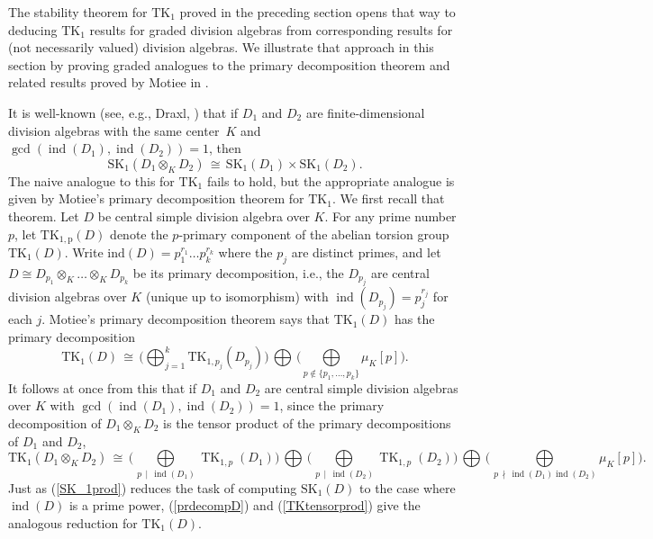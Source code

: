 \documentclass[11pt]{article}
\numberwithin{equation}{section}
\theoremstyle{plain}
\theoremstyle{remark}
\newcommand{\opn}{\operatorname}
\newcommand{\SK}{\opn{SK_1}}
\newcommand{\TK}{\opn{TK_1}}
\newcommand{\ind}{\text{ind}}
\begin{document}
The stability theorem for $\TK$ proved in the preceding section opens that way to deducing $\TK$ results for 
graded division algebras from corresponding results for (not necessarily valued) division algebras.  We 
illustrate that approach in this section by proving graded analogues to the primary decomposition theorem 
and related results  proved by Motiee in \cite{motiee-2013}.

It is well-known (see, e.g.,  Draxl, \cite[Lemma~6, p.~160]{draxl-1983}) that if $D_1$ and $D_2$ are 
finite-dimensional 
division algebras with the same center~$K$ and 
$\opn{gcd}(\opn{ind}(D_1), \opn{ind}(D_2)) = 1$, then
\begin{equation}
\label{SK_1prod}
\SK(D_1 \otimes_K D_2) \, \cong \, \SK(D_1 ) \times \SK(D_2).
\end{equation}
The naive analogue to this for $\TK$ fails to hold, but the appropriate  analogue is given by 
Motiee's 
primary decomposition theorem for $\TK$.   We first recall that theorem.
Let $D$ be central simple division algebra over  $K$.  
 For any  prime number $p$, let $\opn{TK_{1,p}}(D)$ denote the $p$-primary component of the abelian torsion group 
 $\TK(D)$.  
Write $\ind(D) = p_1^{r_1}\ldots p_k^{r_k}$ where the $p_j$ are distinct primes, and let 
$D \cong D_{p_1} \otimes _K \ldots \otimes _K D_{p_k}$ be its primary decomposition, i.e., the $D_{p_j}$ are central 
division algebras over $K$ (unique up to isomorphism) with $\opn{ind}(D_{p_j}) = p_j^{r_j}$ for each $j$.  Motiee's 
primary decomposition theorem \cite[Th.~5]{motiee-2013} says that $\TK(D)$ has the primary decomposition 
\begin{equation}
\label{prdecompD}
        \mathrm{TK}_1(D)\,
        \cong\,
        \big(
        {\textstyle\bigoplus}_{j=1}^k \mathrm{TK}_{1,p_j}(D_{p_j})
        \big)
        \,{\textstyle\bigoplus}\,
        \big(
        \underset{p\notin\{p_1,\ldots,p_k\}}{\textstyle\bigoplus}
        \mu_{K}[p]
        \big).
\end{equation}
It follows at once from this that if $D_1$ and $D_2$ are central simple division algebras over $K$
with $\opn{gcd}(\opn{ind}(D_1), \opn{ind}(D_2)) = 1$, since the primary decomposition of 
$D_1\otimes_K D_2$ is the tensor product of the primary decompositions of $D_1$ and $D_2$,
\begin{equation}
\label{TKtensorprod}
       \TK(D_1\otimes_K D_2)\, \cong\,
        \Big(\underset{\,p\,\mid\,\opn{ind}(D_1)}{\textstyle\bigoplus}\opn{TK}_{1,p}(D_1)\Big)
        \,{\textstyle{\bigoplus}}\,
        \Big(\underset{\,p\,\mid\,\operatorname{ind}(D_2)}{\textstyle{\bigoplus}}\opn{TK}_{1,p}(D_2)\Big)
         \,{\textstyle{\bigoplus}}\,
        \Big(\underset{\,p\,\nmid\,\opn{ind}(D_1)\opn{ind}(D_2)}{\textstyle{\bigoplus}}       \mu_K[p]\Big).
\end{equation} 
Just as (\ref{SK_1prod}) reduces the task of computing $\SK(D)$ to the case where $\opn{ind}(D)$ is a
prime power, (\ref{prdecompD}) and (\ref{TKtensorprod}) give the analogous reduction for $\TK(D)$.
\end{document}
